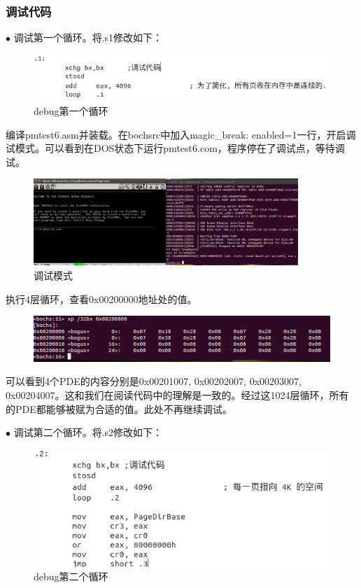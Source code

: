 \documentclass[UTF8,12pt]{ctexart}
\begin{document}
    
    \subsubsection{调试代码\label{调试PTE,PDE}}
    $\bullet$ 调试第一个循环。将.s1修改如下：
    \begin{figure}[H]
        \centering
        \includegraphics{images/debug1.png}
        \caption{debug第一个循环}
        \label{debug1}
    \end{figure}
    编译pmtest6.asm并装载。在bochsrc中加入magic\_break: enabled=1一行，开启调试模式。可以看到在DOS状态下运行pmtest6.com，程序停在了调试点，等待调试。
    \begin{figure}[H]
        \centering
        \includegraphics[width=10cm]{images/debug-status.png}
        \caption{调试模式}
        \label{debug_status}
    \end{figure}
    
    执行4层循环，查看0x00200000地址处的值。
    
    \begin{figure}[H]
        \centering
        \includegraphics[width=12cm]{images/pmtest6_loop1.png}
        \label{pmtest6_loop1}
    \end{figure}
    可以看到4个PDE的内容分别是0x00201007, 0x00202007, 0x00203007, 0x00204007。这和我们在阅读代码中的理解是一致的。经过这1024层循环，所有的PDE都能够被赋为合适的值。此处不再继续调试。
    
    $\bullet$ 调试第二个循环。将.s2修改如下：
    \begin{figure}[H]
        \centering
        \includegraphics[width=12cm]{images/debug2.png}
        \caption{debug第二个循环}
        \label{debug2}
    \end{figure}
    
\end{document}
